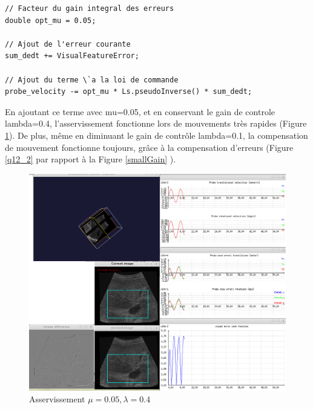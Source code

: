 \documentclass[a4paper,11pt]{article}
\begin{document}
\begin{verbatim}
// Facteur du gain integral des erreurs
double opt_mu = 0.05;

// Ajout de l'erreur courante
sum_dedt += VisualFeatureError;

// Ajout du terme \`a la loi de commande
probe_velocity -= opt_mu * Ls.pseudoInverse() * sum_dedt;
\end{verbatim}


En ajoutant ce terme avec mu=0.05, et en conservant le gain de controle lambda=0.4, l'asservissement fonctionne lors de mouvements tr\`es rapides (Figure \ref{q12_1}). De plus, m\^eme en diminuant le gain de contr\^ole lambda=0.1, la compensation de mouvement fonctionne toujours, gr\^ace \`a la compensation d'erreurs (Figure \ref{q12_2} par rapport \`a la Figure \ref{smallGain} ).
\begin{figure}[H]
    \centering
    \includegraphics[width=0.5\textheight]{./images/q12_0,05_0,4.png}
    \caption{Asservissement $\mu = 0.05, \lambda = 0.4$ }
    \label{q12_1}
\end{figure}
\end{document}
